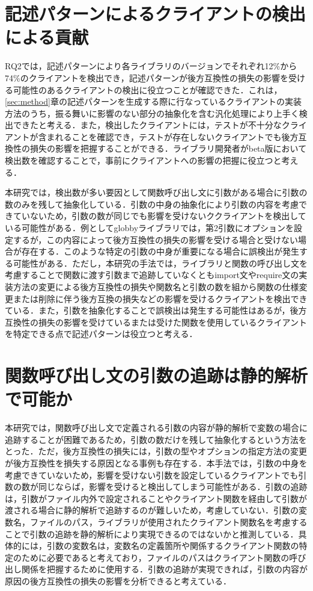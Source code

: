 \documentclass[11pt]{jreport}
\begin{document}
\section{記述パターンによるクライアントの検出による貢献}
RQ2では，記述パターンにより各ライブラリのバージョンでそれぞれ12\%から74\%のクライアントを検出でき，記述パターンが後方互換性の損失の影響を受ける可能性のあるクライアントの検出に役立つことが確認できた．これは，\ref{sec:method}章の記述パターンを生成する際に行なっているクライアントの実装方法のうち，振る舞いに影響のない部分の抽象化を含む汎化処理により上手く検出できたと考える．また，検出したクライアントには，テストが不十分なクライアントが含まれることを確認でき，テストが存在しないクライアントでも後方互換性の損失の影響を把握することができる．ライブラリ開発者がbeta版において検出数を確認することで，事前にクライアントへの影響の把握に役立つと考える．

本研究では，検出数が多い要因として関数呼び出し文に引数がある場合に引数の数のみを残して抽象化している．引数の中身の抽象化により引数の内容を考慮できていないため，引数の数が同じでも影響を受けないククライアントを検出している可能性がある．例としてglobbyライブラリでは，第2引数にオプションを設定するが，この内容によって後方互換性の損失の影響を受ける場合と受けない場合が存在する．このような特定の引数の中身が重要になる場合に誤検出が発生する可能性がある．ただし，本研究の手法では，ライブラリと関数の呼び出し文を考慮することで関数に渡す引数まで追跡していなくともimport文やrequire文の実装方法の変更による後方互換性の損失や関数名と引数の数を組から関数の仕様変更または削除に伴う後方互換の損失などの影響を受けるクライアントを検出できている．また，引数を抽象化することで誤検出は発生する可能性はあるが，後方互換性の損失の影響を受けているまたは受けた関数を使用しているクライアントを特定できる点で記述パターンは役立つと考える．

\section{関数呼び出し文の引数の追跡は静的解析で可能か}

本研究では，関数呼び出し文で定義される引数の内容が静的解析で変数の場合に追跡することが困難であるため，引数の数だけを残して抽象化するという方法をとった．ただ，後方互換性の損失には，引数の型やオプションの指定方法の変更が後方互換性を損失する原因となる事例も存在する．本手法では，引数の中身を考慮できていないため，影響を受けない引数を設定しているクライアントでも引数の数が同じならば，影響を受けると検出してしまう可能性がある．引数の追跡は，引数がファイル内外で設定されることやクライアント関数を経由して引数が渡される場合に静的解析で追跡するのが難しいため，考慮していない．引数の変数名，ファイルのパス，ライブラリが使用されたクライアント関数名を考慮することで引数の追跡を静的解析により実現できるのではないかと推測している．具体的には，引数の変数名は，変数名の定義箇所や関係するクライアント関数の特定のために必要であると考えており，ファイルのパスはクライアント関数の呼び出し関係を把握するために使用する．引数の追跡が実現できれば，引数の内容が原因の後方互換性の損失の影響を分析できると考えている．
\end{document}
